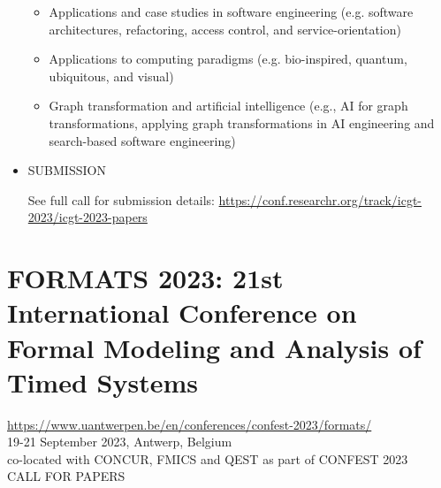 \documentclass[prodmode,acmtecs]{acmsmall} %
\begin{document}
\begin{itemize}
\begin{itemize}
\item  Applications and case studies in software engineering (e.g. software architectures, refactoring, access control, and service-orientation)
\item  Applications to computing paradigms (e.g. bio-inspired, quantum, ubiquitous, and visual)
\item  Graph transformation and artificial intelligence (e.g., AI for graph transformations, applying graph transformations in AI engineering and search-based software engineering) 
\end{itemize} 
\item  SUBMISSION 
 
  See full call for submission details: \href{https://conf.researchr.org/track/icgt-2023/icgt-2023-papers}{https://conf.researchr.org/track/icgt-2023/icgt-2023-papers} 
 
\end{itemize}\section{FORMATS 2023: 21st International Conference on Formal Modeling and Analysis of Timed Systems}\label{FORMATS2023}  \href{https://www.uantwerpen.be/en/conferences/confest-2023/formats/}{https://www.uantwerpen.be/en/conferences/confest-2023/formats/}\\ 
  19-21 September 2023, Antwerp, Belgium\\ 
  co-located with CONCUR, FMICS and QEST as part of CONFEST 2023\\ 
CALL FOR PAPERS 
\end{document}

